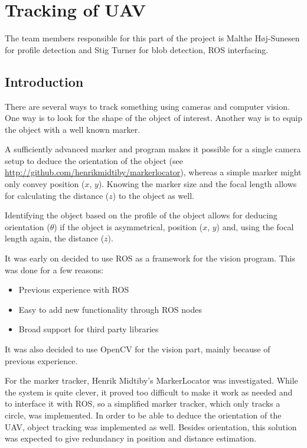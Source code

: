 \section{Tracking of UAV}
The team members responsible for this part of the project is Malthe Høj-Sunesen for profile detection and Stig Turner for blob detection, ROS interfacing.
\subsection{Introduction}
There are several ways to track something using cameras and computer vision. One way is to look for the shape of the object of interest. Another way is to equip the object with a well known marker. 

A sufficiently advanced marker and program makes it possible for a single camera setup to deduce the orientation of the object (see \url{http://github.com/henrikmidtiby/markerlocator}), whereas a simple marker might only convey position ($x$, $y$). Knowing the marker size and the focal length allows for calculating the distance ($z$) to the object as well.

Identifying the object based on the profile of the object allows for deducing orientation ($\theta$) if the object is asymmetrical, position ($x$, $y$) and, using the focal length again, the distance ($z$). 

It was early on decided to use ROS as a framework for the vision program. This was done for a few reasons:
\begin{itemize}
	\item Previous experience with ROS
	\item Easy to add new functionality through ROS nodes
	\item Broad support for third party libraries
\end{itemize}

It was also decided to use OpenCV for the vision part, mainly because of previous experience. 

For the marker tracker, Henrik Midtiby’s MarkerLocator was investigated. While the system is quite clever, it proved too difficult to make it work as needed and to interface it with ROS, so a simplified marker tracker, which only tracks a circle, was implemented. In order to be able to deduce the orientation of the UAV, object tracking was implemented as well. Besides orientation, this solution was expected to give redundancy in position and distance estimation.
